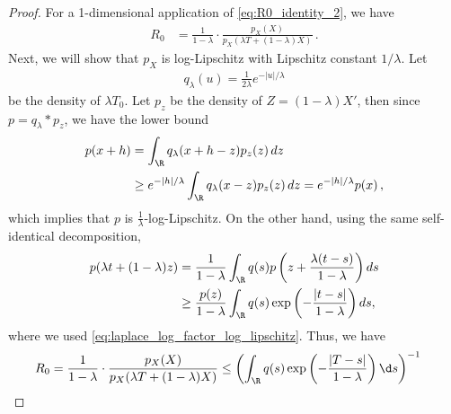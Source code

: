 \begin{proof}
    For a 1-dimensional application of \cref{eq:R0_identity_2}, we have
    \begin{align}
        R_0
         & =
        \frac{1}{1-\lambda}\cdot \frac{p_X(X)}{p_X(\lambda T+(1-\lambda)X)}\,.
        \label{eq:laplace_log_factor_R0_formula}
    \end{align}
    Next, we will show that $p_X$ is log-Lipschitz with Lipschitz constant $1/\lambda$.
    Let
    \begin{align}
        q_\lambda(u)=\frac{1}{2\lambda}e^{-|u|/\lambda}
    \end{align}
    be the density of $\lambda T_0$.
    Let $p_z$ be the density of $Z = (1-\lambda)X'$,
    then since $p=q_\lambda*p_z$, we have the lower bound
    \begin{align}
        p(x+h)
         & =
        \int_\R q_\lambda(x+h-z)p_z(z)\,dz
        \\
         & \ge
        e^{-|h|/\lambda}
        \int_\R q_\lambda(x-z)p_z(z)\,dz
        =
        e^{-|h|/\lambda}p(x)\,,
        \label{eq:laplace_log_factor_log_lipschitz}
    \end{align}
    which implies that $p$ is $\frac{1}{\lambda}$-log-Lipschitz.
    On the other hand, using the same self-identical decomposition,
    \begin{align}
        p(\lambda t+(1-\lambda)z)
         & =
        \frac{1}{1-\lambda}
        \int_\R
        q(s)
        p\left(
        z+\frac{\lambda(t-s)}{1-\lambda}
        \right)
        ds
        \\
         & \ge
        \frac{p(z)}{1-\lambda}
        \int_\R
        q(s)
        \exp\left(
        -\frac{|t-s|}{1-\lambda}
        \right)
        ds,
        \label{eq:laplace_log_factor_denominator_lower}
    \end{align}
    where we used \eqref{eq:laplace_log_factor_log_lipschitz}.
    Thus, we have
    \begin{align}
        R_0
        =
        \frac{1}{1-\lambda}\cdot \frac{p_X(X)}{p_X(\lambda T+(1-\lambda)X)}
         & \le
        \left(
        \int_\R
        q(s)
        \exp\left(
        -\frac{|T-s|}{1-\lambda}
        \right)
        \d s
        \right)^{-1}
        \label{eq:laplace_log_factor_R0_integral_lower}

\end{align}
\end{proof}
